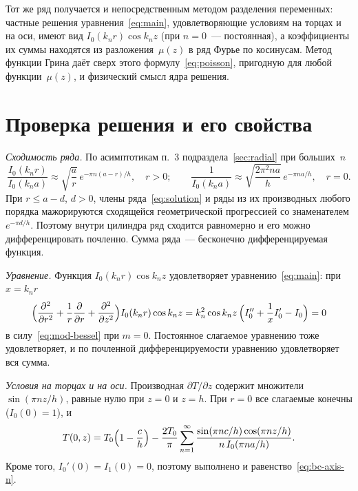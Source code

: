 Тот же ряд получается и непосредственным методом разделения переменных:
частные решения уравнения~\eqref{eq:main}, удовлетворяющие условиям на
торцах и на оси, имеют вид $I_0(k_n r)\cos k_n z$ (при $n=0$~—
постоянная), а коэффициенты их суммы находятся из разложения~$\mu(z)$
в ряд Фурье по косинусам. Метод функции Грина даёт сверх этого
формулу~\eqref{eq:poisson}, пригодную для любой функции~$\mu(z)$,
и физический смысл ядра решения.

\section{Проверка решения и его свойства}
\label{sec:check}

\emph{Сходимость ряда.} По асимптотикам п.~3 подраздела~\ref{sec:radial}
при больших~$n$
\begin{equation}
\label{eq:ratio-asympt}
\frac{I_0(k_n r)}{I_0(k_n a)}\approx\sqrt{\frac{a}{r}}\,
e^{-\pi n(a-r)/h},\quad r>0;\qquad
\frac{1}{I_0(k_n a)}\approx\sqrt{\frac{2\pi^2na}{h}}\,e^{-\pi na/h},\quad r=0 .
\end{equation}
При $r\le a-d$, $d>0$, члены ряда~\eqref{eq:solution} и ряды из
их производных любого порядка мажорируются сходящейся геометрической
прогрессией со знаменателем $e^{-\pi d/h}$. Поэтому
внутри цилиндра ряд сходится равномерно и его можно дифференцировать
почленно. Сумма ряда~— бесконечно дифференцируемая функция.

\emph{Уравнение.} Функция $I_0(k_n r)\cos k_n z$ удовлетворяет
уравнению~\eqref{eq:main}: при $x=k_n r$
\[
\Bigl(\dfrac{\partial^2 }{\partial r^2}+\frac1r\dfrac{\partial }{\partial r}+\dfrac{\partial^2 }{\partial z^2}\Bigr)
I_0(k_n r)\cos k_n z=k_n^2\cos k_n z\,
\Bigl(I_0''+\frac{1}{x}I_0'-I_0\Bigr)=0
\]
в силу~\eqref{eq:mod-bessel} при $m=0$. Постоянное слагаемое уравнению
тоже удовлетворяет, и по почленной дифференцируемости уравнению
удовлетворяет вся сумма.

\emph{Условия на торцах и на оси.} Производная
$\partial T/\partial z$ содержит множители $\sin(\pi nz/h)$, равные нулю
при $z=0$ и $z=h$. При $r=0$ все слагаемые конечны ($I_0(0)=1$), и
\begin{equation}
\label{eq:T-axis}
T(0,z)=T_0\Bigl(1-\frac{c}{h}\Bigr)
-\frac{2T_0}{\pi}\sum_{n=1}^{\infty}
\frac{\sin(\pi nc/h)\cos(\pi nz/h)}{n\,I_0(\pi na/h)} .
\end{equation}
Кроме того, $I_0'(0)=I_1(0)=0$, поэтому выполнено и
равенство~\eqref{eq:bc-axis-n}.

